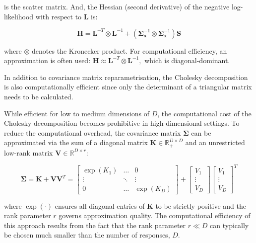 \noindent is the scatter matrix.\cite{tan2021analytic} And, the Hessian (second derivative) of the negative log-likelihood with respect to \( \mathbf{L} \) is:

\[
\mathbf{H} = \mathbf{L}^{-T} \otimes \mathbf{L}^{-1} + (\mathbf{\Sigma}_{\mathbf{x}}^{-1} \otimes \mathbf{\Sigma}_{\mathbf{x}}^{-1}) \mathbf{S}
\]

\noindent where \( \otimes \) denotes the Kronecker product.\cite{tan2021analytic} For computational efficiency, an approximation is often used:
$
\mathbf{H} \approx \mathbf{L}^{-T} \otimes \mathbf{L}^{-1},
$ which is diagonal-dominant.\cite{tan2021analytic}




\noindent In addition to covariance matrix reparametrisation, the Cholesky decomposition is also computationally efficient since only the determinant of a triangular matrix needs to be calculated.\cite{Salinas2019}

While efficient for low to medium dimensions of \( D \), the computational cost of the Cholesky decomposition becomes prohibitive in high-dimensional settings. To reduce the computational overhead, the covariance matrix \( \boldsymbol{\Sigma} \) can be approximated via the sum of a diagonal matrix \( \mathbf{K} \in \mathbb{R}^{D \times D}_+ \) and an unrestricted low-rank matrix \( \mathbf{V} \in \mathbb{R}^{D \times r} \):

\[
\mathbf{\Sigma} = \mathbf{K} + \mathbf{V} \mathbf{V}^{T}
= \begin{bmatrix}
\exp(K_1) & \dots & 0 \\
\vdots & \ddots & \vdots \\
0 & \dots & \exp(K_D)
\end{bmatrix}
+ 
\begin{bmatrix}
V_1 \\
\vdots \\
V_D
\end{bmatrix}
\begin{bmatrix}
V_1 \\
\vdots \\
V_D
\end{bmatrix}^{T}
\]

\noindent where $\exp(\cdot)$ ensures all diagonal entries of $\mathbf{K}$ to be strictly positive and the rank parameter $r$ governs approximation quality.\cite{marz2022multi} The computational efficiency of this approach results from the fact that the rank parameter $r \ll D$ can typically be chosen much smaller than the number of responses, $D$.\cite{Salinas2019}

